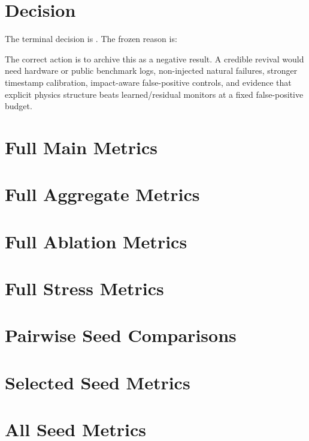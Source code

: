 \documentclass{article}
\begin{document}
\section{Decision}

The terminal decision is \textbf{\PaperDecision}. The frozen reason is:

\begin{quote}
\PaperDecisionReason
\end{quote}

The correct action is to archive this as a negative result. A credible revival would need hardware or public benchmark logs, non-injected natural failures, stronger timestamp calibration, impact-aware false-positive controls, and evidence that explicit physics structure beats learned/residual monitors at a fixed false-positive budget.



\clearpage
\appendix

\section{Full Main Metrics}


\section{Full Aggregate Metrics}


\section{Full Ablation Metrics}


\section{Full Stress Metrics}


\section{Pairwise Seed Comparisons}


\section{Selected Seed Metrics}


\section{All Seed Metrics}




\end{document}
